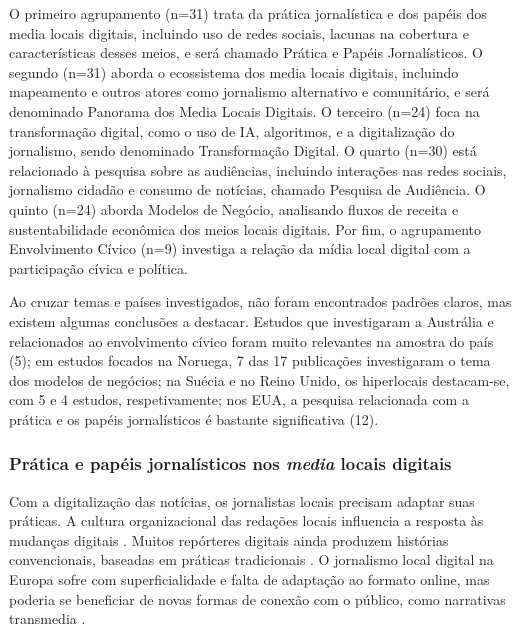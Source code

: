 \documentclass[portuguese]{textolivre}
\begin{document}
O primeiro agrupamento (n=31) trata da prática jornalística e dos papéis dos media locais digitais, incluindo uso de redes sociais, lacunas na cobertura e características desses meios, e será chamado Prática e Papéis Jornalísticos. O segundo (n=31) aborda o ecossistema dos media locais digitais, incluindo mapeamento e outros atores como jornalismo alternativo e comunitário, e será denominado Panorama dos Media Locais Digitais. O terceiro (n=24) foca na transformação digital, como o uso de IA, algoritmos, e a digitalização do jornalismo, sendo denominado Transformação Digital. O quarto (n=30) está relacionado à pesquisa sobre as audiências, incluindo interações nas redes sociais, jornalismo cidadão e consumo de notícias, chamado Pesquisa de Audiência. O quinto (n=24) aborda Modelos de Negócio, analisando fluxos de receita e sustentabilidade econômica dos meios locais digitais. Por fim, o agrupamento Envolvimento Cívico (n=9) investiga a relação da mídia local digital com a participação cívica e política.

Ao cruzar temas e países investigados, não foram encontrados padrões claros, mas existem algumas conclusões a destacar. Estudos que investigaram a Austrália e relacionados ao envolvimento cívico foram muito relevantes na amostra do país (5); em estudos focados na Noruega, 7 das 17 publicações investigaram o tema dos modelos de negócios; na Suécia e no Reino Unido, os hiperlocais destacam-se, com 5 e 4 estudos, respetivamente; nos EUA, a pesquisa relacionada com a prática e os papéis jornalísticos é bastante significativa (12).

\subsubsection{Prática e papéis jornalísticos nos \textit{media} locais digitais}


Com a digitalização das notícias, os jornalistas locais precisam adaptar suas práticas. A cultura organizacional das redações locais influencia a resposta às mudanças digitais \cite{ohara2023}. Muitos repórteres digitais ainda produzem histórias convencionais, baseadas em práticas tradicionais \cite{ryfe2016}. O jornalismo local digital na Europa sofre com superficialidade e falta de adaptação ao formato online, mas poderia se beneficiar de novas formas de conexão com o público, como narrativas transmedia \cite{rivasderoca2020}.
\end{document}
